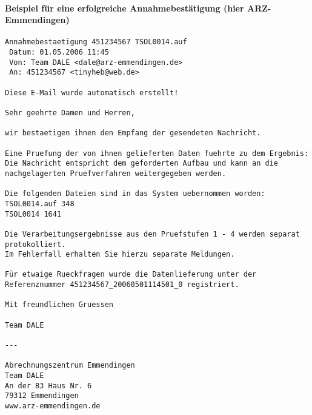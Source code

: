 \paragraph{Beispiel für eine erfolgreiche Annahmebestätigung (hier ARZ-Emmendingen)}
\begin{verbatim}
Annahmebestaetigung 451234567 TSOL0014.auf
 Datum: 01.05.2006 11:45
 Von: Team DALE <dale@arz-emmendingen.de>
 An: 451234567 <tinyheb@web.de>
 
Diese E-Mail wurde automatisch erstellt!

Sehr geehrte Damen und Herren,

wir bestaetigen ihnen den Empfang der gesendeten Nachricht.

Eine Pruefung der von ihnen gelieferten Daten fuehrte zu dem Ergebnis:
Die Nachricht entspricht dem geforderten Aufbau und kann an die 
nachgelagerten Pruefverfahren weitergegeben werden.

Die folgenden Dateien sind in das System uebernommen worden:
TSOL0014.auf 348
TSOL0014 1641

Die Verarbeitungsergebnisse aus den Pruefstufen 1 - 4 werden separat 
protokolliert. 
Im Fehlerfall erhalten Sie hierzu separate Meldungen.

Für etwaige Rueckfragen wurde die Datenlieferung unter der 
Referenznummer 451234567_20060501114501_0 registriert.

Mit freundlichen Gruessen

Team DALE

---

Abrechnungszentrum Emmendingen
Team DALE
An der B3 Haus Nr. 6
79312 Emmendingen
www.arz-emmendingen.de
\end{verbatim}

